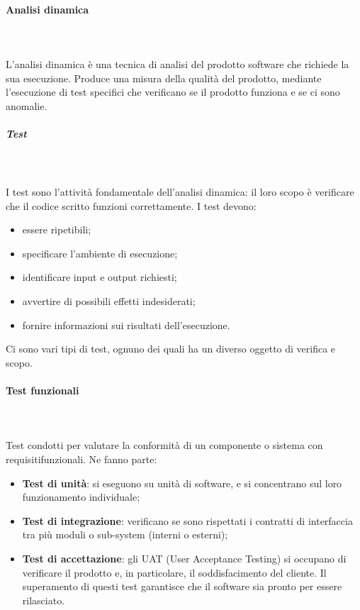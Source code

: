 \paragraph{Analisi dinamica} \mbox{} \\ \mbox{} \\
L'analisi dinamica è una tecnica di analisi del prodotto software che richiede la sua esecuzione. Produce una misura della qualità del prodotto, mediante l'esecuzione di test specifici che verificano se il prodotto funziona e se ci sono anomalie.

\subparagraph{Test} \mbox{} \\ \mbox{} \\
I test sono l'attività fondamentale dell'analisi dinamica: il loro scopo è verificare che il codice
scritto funzioni correttamente. I test devono:
\begin{itemize}
\item essere ripetibili;
\item specificare l'ambiente di esecuzione;
\item identificare input e output richiesti;
\item avvertire di possibili effetti indesiderati;
\item fornire informazioni sui risultati dell'esecuzione.
\end{itemize}
Ci sono vari tipi di test, ognuno dei quali ha un diverso oggetto di verifica e scopo.

\paragraph*{Test funzionali} \mbox{} \\ \mbox{} \\
Test condotti per valutare la conformità di un componente o sistema con requisiti\glo funzionali. Ne fanno parte: \begin{itemize}
\item \textbf{Test di unità}: si eseguono su unità di software, e si concentrano sul loro funzionamento individuale;
\item \textbf{Test di integrazione}: verificano se sono rispettati i contratti di interfaccia tra più moduli o sub-system (interni o esterni);
\item \textbf{Test di accettazione}: gli UAT (User Acceptance Testing) si occupano di verificare il prodotto e, in particolare, il soddisfacimento del cliente. Il superamento di questi test garantisce che il software sia pronto per essere rilasciato.
\end{itemize}

